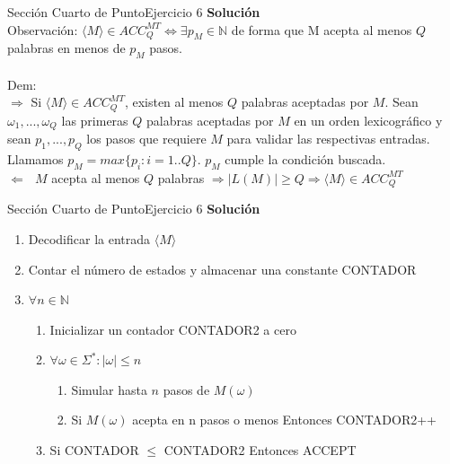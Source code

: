 \documentclass[10pt, envcountsect, presentation, aspectratio=169]{beamer}
\begin{document}
\begin{frame}{Sección Cuarto de Punto}{Ejercicio 6}
    \textbf{Solución}\\
    Observación: $\langle M \rangle \in ACC_{Q}^{MT} \Leftrightarrow \exists p_M \in \mathbb{N}$ de forma que M acepta al menos $Q$ palabras en menos de $p_M$ pasos.\\~\\
    Dem:\\
    $\boxed{\Rightarrow}$ Si $\langle M \rangle \in ACC_{Q}^{MT}$, existen al menos $Q$ palabras aceptadas por $M$.
    Sean $\omega_1, ..., \omega_Q$ las primeras $Q$ palabras aceptadas por $M$ en un orden lexicográfico y sean $p_1,...,p_Q$ los pasos que requiere $M$ para validar las respectivas entradas.
    Llamamos $p_M = max\{p_i:i=1..Q\}$. $p_M$ cumple la condición buscada.\\
    $\boxed{\Leftarrow} \text{ } M$ acepta al menos $Q$ palabras  $\Rightarrow |L(M)| \geq Q \Rightarrow \langle M \rangle \in ACC_{Q}^{MT}$  
\end{frame}
    


\begin{frame}{Sección Cuarto de Punto}{Ejercicio 6}
    \textbf{Solución}\\
    \begin{enumerate}
        \item Decodificar la entrada $\langle M \rangle$
        \item Contar el número de estados y almacenar una constante CONTADOR
        \item $\forall n \in \mathbb{N}$
        \begin{enumerate}
            \item Inicializar un contador CONTADOR2 a cero 
            \item $\forall \omega \in \Sigma^* : |\omega| \leq n$
            \begin{enumerate}
                \item Simular hasta $n$ pasos de $M(\omega)$
                \item Si $M(\omega)$ acepta en n pasos o menos Entonces CONTADOR2++
            \end{enumerate}
            \item Si CONTADOR $\leq$ CONTADOR2 Entonces ACCEPT
        \end{enumerate}
    \end{enumerate}
\end{frame}
\end{document}
